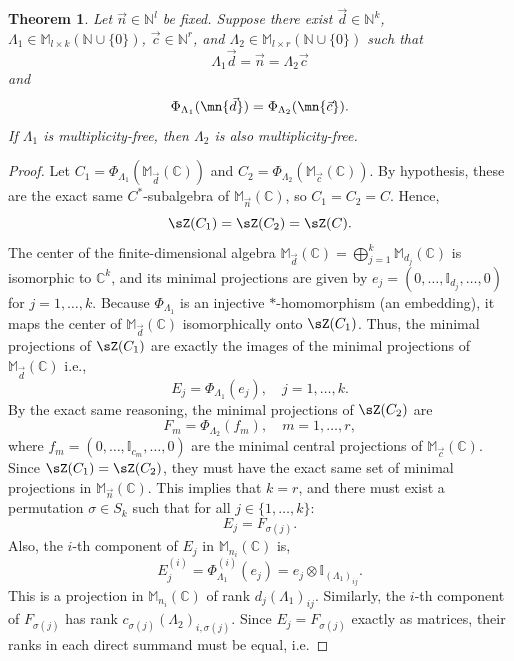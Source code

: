\documentclass[12pt,a4paper]{amsart}
\theoremstyle{plain}
\newtheorem{theorem}{Theorem}[section]
\theoremstyle{definition}
\theoremstyle{remark}
\numberwithin{equation}{section}
\theoremstyle{ser}
\theoremstyle{serr}
\theoremstyle{ser}
\theoremstyle{ser}
\theoremstyle{collabquestion}
\newcommand{\N}{\mathbb{N}}
\newcommand{\<}{\langle}
\renewcommand{\>}{\rangle}
\begin{document}
\begin{theorem}\label{thm:mult_free_invariance}
    Let $\vec{n} \in \mathbb{N}^l$ be fixed. Suppose there exist
    $\vec{d} \in \mathbb{N}^k$, $\Lambda_1 \in \mathbb{M}_{l \times k}(\N \cup \{0\})$,
    $\vec{c} \in \mathbb{N}^r$, and $\Lambda_2 \in \mathbb{M}_{l \times r}(\N \cup \{0\})$
    such that
    \[
        \Lambda_1 \vec{d} = \vec{n} = \Lambda_2 \vec{c}
    \]
    and
    \[
        \Phi_{\Lambda_1}(\mn{\vec{d}})
        =
        \Phi_{\Lambda_2}(\mn{\vec{c}}).
    \]
    If $\Lambda_1$ is multiplicity-free, then $\Lambda_2$ is also
    multiplicity-free.
\end{theorem}
\begin{proof}
    Let $C_1 = \Phi_{\Lambda_1}\left(\mathbb{M}_{\vec{d}}(\mathbb{C})\right)$ and $C_2 = \Phi_{\Lambda_2}\left(\mathbb{M}_{\vec{c}}(\mathbb{C})\right)$. By hypothesis, these are the exact same $C^*$-subalgebra of $\mathbb{M}_{\vec{n}}(\mathbb{C})$, so $C_1 = C_2 = C$. Hence,
    $$\sZ(C_1) = \sZ(C_2) = \sZ(C).$$
    The center of the finite-dimensional algebra $\mathbb{M}_{\vec{d}}(\mathbb{C}) = \bigoplus_{j=1}^k \mathbb{M}_{d_j}(\mathbb{C})$ is isomorphic to $\mathbb{C}^k$, and its minimal projections are given by $e_j = (0, \dots, \mathbb{I}_{d_j}, \dots, 0)$ for $j = 1, \dots, k$. Because $\Phi_{\Lambda_1}$ is an injective $*$-homomorphism (an embedding), it maps the center of $\mathbb{M}_{\vec{d}}(\mathbb{C})$ isomorphically onto $\sZ(C_1)$. Thus, the minimal projections of $\sZ(C_1)$ are exactly the images of the minimal projections of $\mathbb{M}_{\vec{d}}(\mathbb{C})$ i.e.,
    $$E_j = \Phi_{\Lambda_1}(e_j), \quad j = 1, \dots, k.$$
    By the exact same reasoning, the minimal projections of $\sZ(C_2)$ are$$F_m = \Phi_{\Lambda_2}(f_m), \quad m = 1, \dots, r,$$where $f_m = (0, \dots, \mathbb{I}_{c_m}, \dots, 0)$ are the minimal central projections of $\mathbb{M}_{\vec{c}}(\mathbb{C})$. Since $\sZ(C_1) = \sZ(C_2)$, they must have the exact same set of minimal projections in $\mathbb{M}_{\vec{n}}(\mathbb{C})$. This implies that $k = r$, and there must exist a permutation $\sigma \in S_k$ such that for all $j \in \{1, \dots, k\}$:$$E_j = F_{\sigma(j)}.$$ 
    Also, the $i$-th component of $E_j$ in $\mathbb{M}_{n_i}(\mathbb{C})$ is,
    $$E_j^{(i)} = \Phi_{\Lambda_1}^{(i)}(e_j) = e_j \otimes \mathbb{I}_{(\Lambda_1)_{ij}}.$$This is a projection in $\mathbb{M}_{n_i}(\mathbb{C})$ of rank $d_j (\Lambda_1)_{ij}$. Similarly, the $i$-th component of $F_{\sigma(j)}$ has rank $c_{\sigma(j)} (\Lambda_2)_{i, \sigma(j)}$. Since $E_j = F_{\sigma(j)}$ exactly as matrices, their ranks in each direct summand must be equal, i.e.

\end{proof}
\end{document}
